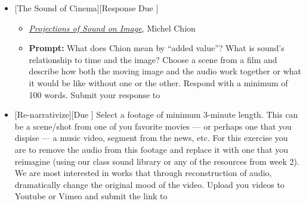 \begin{itemize}[noitemsep,topsep=0pt,leftmargin=*]
	\item {}[The Sound of Cinema][Response Due \dMon]
	      \begin{itemize}
		      \item \href{supplements/MICHEL_CHION_PROJECTIONS_OF_SOUND_ON_IMAGE.pdf}{\emph{Projections of Sound on Image}}, Michel Chion
		      \item \textbf{Prompt:} What does Chion mean by ``added value''? What is sound's relationship to time and the image? Choose a scene from a film and describe how both the moving image and the audio work together or what it would be like without one or the other. Respond with a minimum of 100 words. Submit your response to \discordR
	      \end{itemize}
	\item {}[Re-narrativize][Due \dSun] \newline
	      Select a footage of minimum 3-minute length. This can be a scene/shot from one of you favorite movies --- or perhaps one that you dispise --- a music video, segment from the news, etc. For this exercise you are to remove the audio from this footage and replace it with one that you reimagine (using our class sound library or any of the resources from week 2). We are most interested in works that through reconstruction of audio, dramatically change the original mood of the video. Upload you videos to Youtube or Vimeo and submit the link to \discordE

\end{itemize}
